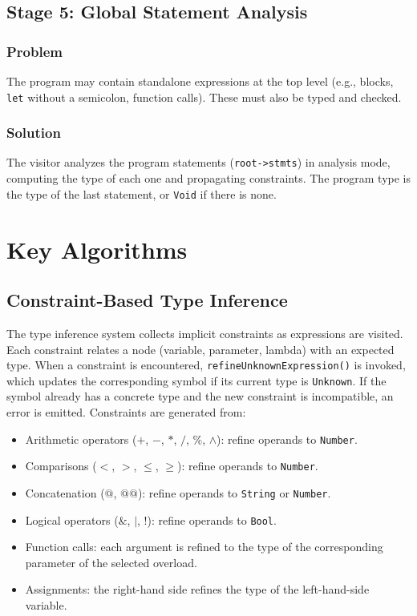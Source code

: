 \documentclass[12pt,a4paper]{report}
\begin{document}
\subsection{Stage 5: Global Statement Analysis}

\subsubsection{Problem}
The program may contain standalone expressions at the top level (e.g., blocks, \texttt{let} without a semicolon, function calls).
These must also be typed and checked.

\subsubsection{Solution}
The visitor analyzes the program statements (\texttt{root->stmts}) in analysis mode, computing the type of each one and propagating constraints.
The program type is the type of the last statement, or \texttt{Void} if there is none.

\section{Key Algorithms}

\subsection{Constraint-Based Type Inference}

The type inference system collects implicit constraints as expressions are visited.
Each constraint relates a node (variable, parameter, lambda) with an expected type.
When a constraint is encountered, \texttt{refineUnknownExpression()} is invoked,
which updates the corresponding symbol if its current type is \texttt{Unknown}.
If the symbol already has a concrete type and the new constraint is incompatible,
an error is emitted.
Constraints are generated from:

\begin{itemize}
    \item Arithmetic operators ($+$, $-$, $*$, $/$, $\%$, $\wedge$): refine operands to \texttt{Number}.
    \item Comparisons ($<$, $>$, $\le$, $\ge$): refine operands to \texttt{Number}.
    \item Concatenation ($@$, $@@$): refine operands to \texttt{String} or \texttt{Number}.
    \item Logical operators ($\&$, $|$, $!$): refine operands to \texttt{Bool}.
    \item Function calls: each argument is refined to the type of the corresponding parameter of the selected overload.
    \item Assignments: the right-hand side refines the type of the left-hand-side variable.
\end{itemize}
\end{document}
